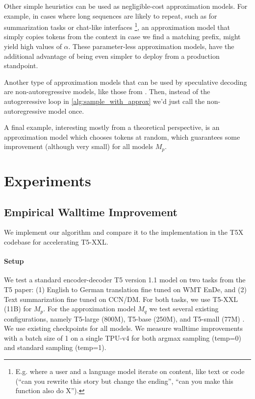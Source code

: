 \documentclass[nohyperref]{article}
\theoremstyle{plain}
\theoremstyle{definition}
\theoremstyle{remark}
\begin{document}
Other simple heuristics can be used as negligible-cost approximation models.
For example, in cases where long sequences are likely to repeat, such as for summarization tasks or chat-like interfaces \footnote{E.g. where a user and a language model iterate on content, like text or code (``can you rewrite this story but change the ending'', ``can you make this function also do X'').}, an approximation model that simply copies tokens from the context in case we find a matching prefix, might yield high values of $\alpha$.
These parameter-less approximation models, have the additional advantage of being even simpler to deploy from a production standpoint.

Another type of approximation models that can be used by speculative decoding are non-autoregressive models, like those from \citep{Blockwise_Parallel_Decoding}. Then, instead of the autogreressive loop in \cref{alg:sample_with_approx} we'd just call the non-autoregressive model once.

A final example, interesting mostly from a theoretical perspective, is an approximation model which chooses tokens at random, which guarantees some improvement (although very small) for all models $M_p$.

\vspace{1.04cm}

\section{Experiments}
\label{sec:experiments}

\subsection{Empirical Walltime Improvement}
\label{sec:empirical-t5-time}

We implement our algorithm and compare it to the implementation in the T5X codebase for accelerating T5-XXL.

\paragraph{Setup} We test a standard encoder-decoder T5 version 1.1 model \citep{t5} on two tasks from the T5 paper: (1) English to German translation fine tuned on WMT EnDe, and (2) Text summarization fine tuned on CCN/DM. For both tasks, we use T5-XXL (11B) for $M_p$. For the approximation model $M_q$ we test several existing configurations, namely T5-large (800M), T5-base (250M), and T5-small (77M) \citep{t5}. We use existing checkpoints for all models. We measure walltime improvements with a batch size of 1 on a single TPU-v4 for both argmax sampling (temp=0) and standard sampling (temp=1).
\end{document}
